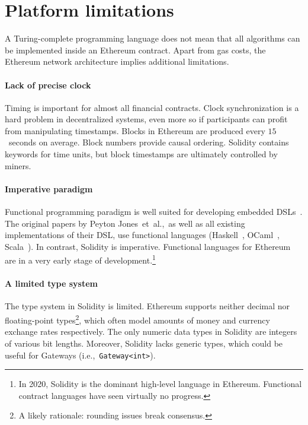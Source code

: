 \section{Platform limitations}

A Turing-complete programming language does not mean that all algorithms can be implemented inside an Ethereum contract.
Apart from gas costs, the Ethereum network architecture implies additional limitations.

\paragraph{Lack of precise clock}
Timing is important for almost all financial contracts.
Clock synchronization is a hard problem in decentralized systems, even more so if participants can profit from manipulating timestamps.
Blocks in Ethereum are produced every $15$~seconds on average.
Block numbers provide causal ordering.
Solidity contains keywords for time units, but block timestamps are ultimately controlled by miners.

\paragraph{Imperative paradigm}
Functional programming paradigm is well suited for developing embedded DSLs~\cite{Gibbons2015}.
The original papers by Peyton Jones~et~al.,~as well as all existing implementations of their DSL, use functional languages (Haskell~\cite{PeytonJones2000, Jones2003, Straaten2007}, OCaml~\cite{LexiFi}, Scala~\cite{Walton2012, Chaudhary2015}).
In contrast, Solidity is imperative.
Functional languages for Ethereum~\cite{FpEthereum2017} are in a very early stage of development.\footnote{In 2020, Solidity is the dominant high-level language in Ethereum. Functional contract languages have seen virtually no progress.}

\paragraph{A limited type system}
The type system in Solidity is limited.
Ethereum supports neither decimal nor floating-point types\footnote{A likely rationale: rounding issues break consensus.}, which often model amounts of money and currency exchange rates respectively.
The only numeric data types in Solidity are integers of various bit lengths.
Moreover, Solidity lacks generic types, which could be useful for Gateways (i.e.,~\texttt{Gateway<int>}).




